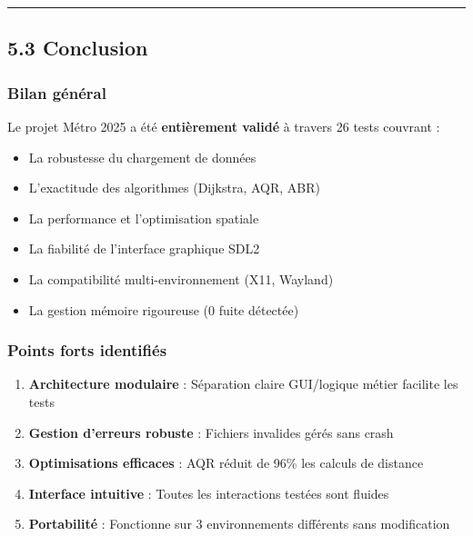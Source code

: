 \documentclass[
]{article}
\providecommand{\tightlist}{%
  \setlength{\itemsep}{0pt}\setlength{\parskip}{0pt}}
\begin{document}
\begin{center}\rule{0.5\linewidth}{0.5pt}\end{center}

\subsection{5.3 Conclusion}\label{conclusion}

\subsubsection{Bilan général}\label{bilan-guxe9nuxe9ral}

Le projet Métro 2025 a été \textbf{entièrement validé} à travers 26
tests couvrant :

\begin{itemize}
\tightlist
\item
  La robustesse du chargement de données
\item
  L'exactitude des algorithmes (Dijkstra, AQR, ABR)
\item
  La performance et l'optimisation spatiale
\item
  La fiabilité de l'interface graphique SDL2
\item
  La compatibilité multi-environnement (X11, Wayland)
\item
  La gestion mémoire rigoureuse (0 fuite détectée)
\end{itemize}

\subsubsection{Points forts
identifiés}\label{points-forts-identifiuxe9s}

\begin{enumerate}
\def\labelenumi{\arabic{enumi}.}
\tightlist
\item
  \textbf{Architecture modulaire} : Séparation claire GUI/logique métier
  facilite les tests
\item
  \textbf{Gestion d'erreurs robuste} : Fichiers invalides gérés sans
  crash
\item
  \textbf{Optimisations efficaces} : AQR réduit de 96\% les calculs de
  distance
\item
  \textbf{Interface intuitive} : Toutes les interactions testées sont
  fluides
\item
  \textbf{Portabilité} : Fonctionne sur 3 environnements différents sans
  modification
\end{enumerate}
\end{document}
